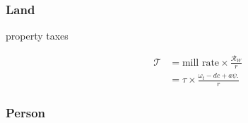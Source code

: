     \subsubsection{Land}
\begin{description}
\item[property taxes]
\begin{align*}
\mathcal{T} &= \text{mill rate} \times \frac{\mathcal{R}_W}{r} \\
&= \tau \times \frac{\omega_t- {dc} + a\psi.}{r}
\end{align*}


\end{description}

    \subsubsection{Person}
